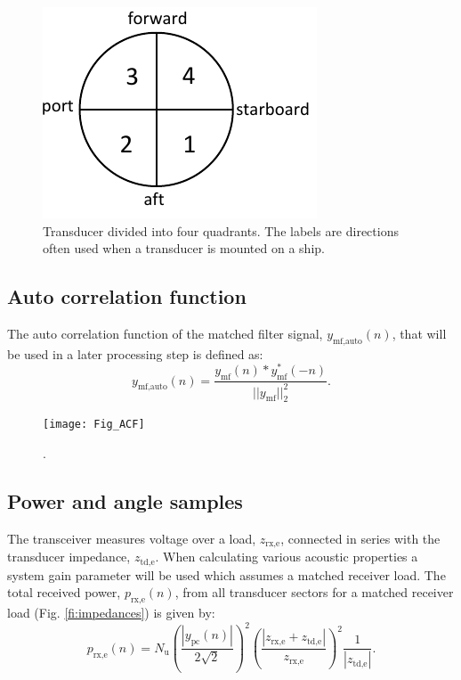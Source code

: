 \documentclass[preprint,12pt,TurnOnLineNumbers]{JASAnew}
\newcommand{\samplesymt}{n}
\newcommand{\nchannels}{N_{\textrm{u}}}
\newcommand{\zrxe}{z_{\textrm{rx,e}}}
\newcommand{\ztde}{z_{\textrm{td,e}}}
\newcommand{\prxe}{p_{\textrm{rx,e}}}
\newcommand{\ymf}{y_{\textrm{mf}}}
\newcommand{\ypc}{y_{\textrm{pc}}}
\newcommand{\ymfauto}{y_{\textrm{mf,auto}}}
\begin{document}
\begin{figure}
\includegraphics{Fig_trd_quad}
\caption{\label{fi:trd_quad}Transducer divided into four quadrants. The labels are directions often used when a transducer is mounted on a ship.}
\end{figure}
%
\subsection{Auto correlation function}
The auto correlation function of the matched filter signal, $\ymfauto(\samplesymt)$, that will be used in a later processing step is defined as:
\begin{equation}
\label{eq:TXAuto}
\ymfauto(\samplesymt) = \frac{\ymf(\samplesymt)*\ymf^*(-\samplesymt)}{||\ymf||^2_2}.
\end{equation}

\begin{figure}
\texttt{[image: Fig\_ACF]}
\caption{\label{fi:ACF}.}
\end{figure}



\subsection{Power and angle samples}
The transceiver measures voltage over a load, $\zrxe$, connected in series with the transducer impedance, $\ztde$. When calculating various acoustic properties a system gain parameter will be used which assumes a matched receiver load. The total received power, $\prxe(\samplesymt)$, from all transducer sectors for a matched receiver load (Fig. \ref{fi:impedances}) is given by: 
\begin{equation}
\label{eq:prx}
\prxe(\samplesymt) = \nchannels\left( \frac{|\ypc(\samplesymt)|}{2\sqrt{2}} \right)^2 \left( \frac{|\zrxe+\ztde|}{\zrxe} \right)^2 \frac{1}{|\ztde|}.
\end{equation}
\end{document}
